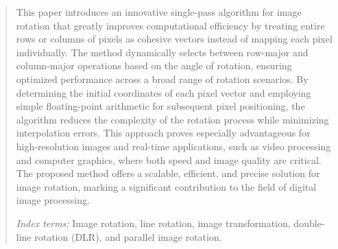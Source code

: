 \documentclass[conference]{IEEEtran}
\begin{document}
\maketitle
\begin{abstract}
    This paper introduces an innovative single-pass algorithm for image rotation that greatly improves computational efficiency by treating entire rows or columns of pixels as cohesive vectors instead of mapping each pixel individually. The method dynamically selects between row-major and column-major operations based on the angle of rotation, ensuring optimized performance across a broad range of rotation scenarios. By determining the initial coordinates of each pixel vector and employing simple floating-point arithmetic for subsequent pixel positioning, the algorithm reduces the complexity of the rotation process while minimizing interpolation errors. This approach proves especially advantageous for high-resolution images and real-time applications, such as video processing and computer graphics, where both speed and image quality are critical. The proposed method offers a scalable, efficient, and precise solution for image rotation, marking a significant contribution to the field of digital image processing.

    \textit{Index terms:} Image rotation, line rotation, image transformation, double-line rotation (DLR), and parallel image rotation.
\end{abstract}
\IEEEpeerreviewmaketitle
\end{document}
